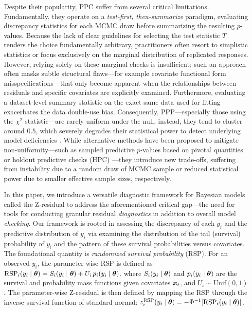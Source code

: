 Despite their popularity, PPC suffer from several critical limitations. Fundamentally, they operate on a \textit{test-first, then-summarize} paradigm, evaluating discrepancy statistics for each MCMC draw before summarizing the resulting $p$-values. Because the lack of clear guidelines for selecting the test statistic $T$ renders the choice fundamentally arbitrary, practitioners often resort to simplistic statistics or focus exclusively on the marginal distribution of replicated responses. However, relying solely on these marginal checks is insufficient; such an approach often masks subtle structural flaws—for example covariate functional form misspecifications—that only become apparent when the relationships between residuals and specific covariates are explicitly examined. Furthermore, evaluating a dataset-level summary statistic on the exact same data used for fitting exacerbates the data double-use bias. Consequently, PPP---especially those using the $\chi^2$ statistic---are rarely uniform under the null; instead, they tend to cluster around $0.5$, which severely degrades their statistical power to detect underlying model deficiencies \citep{Robins2000, Bayarri2000, Sinharay2003, Gelman2013Tsef}. While alternative methods have been proposed to mitigate non-uniformity---such as sampled predictive $p$-values based on pivotal quantities \citep{johnson_bayesian_2007} or holdout predictive checks (HPC) \citep{moranHoldoutPredictiveChecks2024}---they introduce new trade-offs, suffering from instability due to a random draw of MCMC sample or reduced statistical power due to smaller effective sample sizes, respectively. 

In this paper, we introduce a versatile diagnostic framework for Bayesian models called the Z-residual to address the aforementioned critical gap---the need for tools for conducting granular residual \textit{diagnostics} in addition to overall model \textit{checking}. Our framework is rooted in assessing the discrepancy of each $y_i$ and the predictive distribution of $y_i$ via examining the distribution of the tail (survival) probability of $y_i$ and the pattern of these survival probabilities versus covariates. The foundational quantity is \emph{randomized survival probability} (RSP). For an observed $y_i$, the parameter-wise RSP is defined as $\text{RSP}_i(y_i \mid \bm{\theta}) = S_i(y_i \mid \bm{\theta}) + U_i \, p_i(y_i \mid \bm{\theta})$, where $S_i(y_i \mid \bm{\theta})$ and $p_i(y_i \mid \bm{\theta})$ are the survival and probability mass functions given covariates $\bm{x}_i$, and $U_i \sim \mathrm{Unif}(0,1)$. The parameter-wise Z-residual is then defined by mapping the RSP through the inverse-survival function of standard normal: $z_i^{\text{RSP}}(y_i \mid \bm{\theta}) = -\Phi^{-1}[\text{RSP}_i(y_i \mid \bm{\theta})]$.

